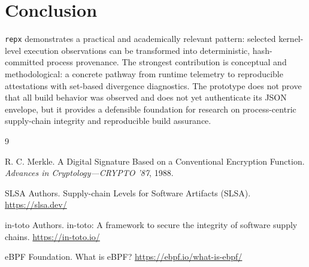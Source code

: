 \documentclass[11pt]{article}
\begin{document}
\section{Conclusion}
\texttt{repx} demonstrates a practical and academically relevant pattern: selected kernel-level execution observations can be transformed into deterministic, hash-committed process provenance. The strongest contribution is conceptual and methodological: a concrete pathway from runtime telemetry to reproducible attestations with set-based divergence diagnostics. The prototype does not prove that all build behavior was observed and does not yet authenticate its JSON envelope, but it provides a defensible foundation for research on process-centric supply-chain integrity and reproducible build assurance.

\begin{thebibliography}{9}

R. C. Merkle.
\newblock A Digital Signature Based on a Conventional Encryption Function.
\newblock \emph{Advances in Cryptology---CRYPTO '87}, 1988.

SLSA Authors.
\newblock Supply-chain Levels for Software Artifacts (SLSA).
\newblock \url{https://slsa.dev/}

in-toto Authors.
\newblock in-toto: A framework to secure the integrity of software supply chains.
\newblock \url{https://in-toto.io/}

eBPF Foundation.
\newblock What is eBPF?
\newblock \url{https://ebpf.io/what-is-ebpf/}

\end{thebibliography}
\end{document}
